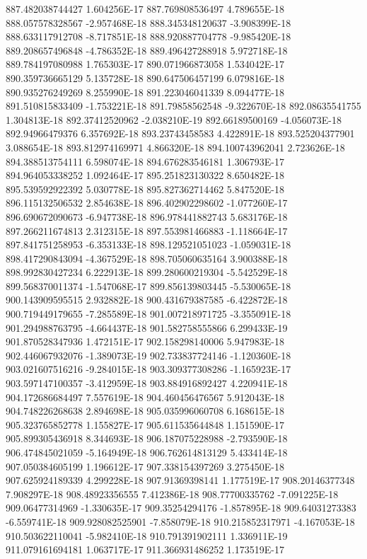 887.482038744427  1.604256E-17
887.769808536497  4.789655E-18
888.057578328567  -2.957468E-18
888.345348120637  -3.908399E-18
888.633117912708  -8.717851E-18
888.920887704778  -9.985420E-18
889.208657496848  -4.786352E-18
889.496427288918  5.972718E-18
889.784197080988  1.765303E-17
890.071966873058  1.534042E-17
890.359736665129  5.135728E-18
890.647506457199  6.079816E-18
890.935276249269  8.255990E-18
891.223046041339  8.094477E-18
891.510815833409  -1.753221E-18
891.79858562548  -9.322670E-18
892.08635541755  1.304813E-18
892.37412520962  -2.038210E-19
892.66189500169  -4.056073E-18
892.94966479376  6.357692E-18
893.23743458583  4.422891E-18
893.525204377901  3.088654E-18
893.812974169971  4.866320E-18
894.100743962041  2.723626E-18
894.388513754111  6.598074E-18
894.676283546181  1.306793E-17
894.964053338252  1.092464E-17
895.251823130322  8.650482E-18
895.539592922392  5.030778E-18
895.827362714462  5.847520E-18
896.115132506532  2.854638E-18
896.402902298602  -1.077260E-17
896.690672090673  -6.947738E-18
896.978441882743  5.683176E-18
897.266211674813  2.312315E-18
897.553981466883  -1.118664E-17
897.841751258953  -6.353133E-18
898.129521051023  -1.059031E-18
898.417290843094  -4.367529E-18
898.705060635164  3.900388E-18
898.992830427234  6.222913E-18
899.280600219304  -5.542529E-18
899.568370011374  -1.547068E-17
899.856139803445  -5.530065E-18
900.143909595515  2.932882E-18
900.431679387585  -6.422872E-18
900.719449179655  -7.285589E-18
901.007218971725  -3.355091E-18
901.294988763795  -4.664437E-18
901.582758555866  6.299433E-19
901.870528347936  1.472151E-17
902.158298140006  5.947983E-18
902.446067932076  -1.389073E-19
902.733837724146  -1.120360E-18
903.021607516216  -9.284015E-18
903.309377308286  -1.165923E-17
903.597147100357  -3.412959E-18
903.884916892427  4.220941E-18
904.172686684497  7.557619E-18
904.460456476567  5.912043E-18
904.748226268638  2.894698E-18
905.035996060708  6.168615E-18
905.323765852778  1.155827E-17
905.611535644848  1.151590E-17
905.899305436918  8.344693E-18
906.187075228988  -2.793590E-18
906.474845021059  -5.164949E-18
906.762614813129  5.433414E-18
907.050384605199  1.196612E-17
907.338154397269  3.275450E-18
907.625924189339  4.299228E-18
907.91369398141  1.177519E-17
908.20146377348  7.908297E-18
908.48923356555  7.412386E-18
908.77700335762  -7.091225E-18
909.06477314969  -1.330635E-17
909.35254294176  -1.857895E-18
909.64031273383  -6.559741E-18
909.928082525901  -7.858079E-18
910.215852317971  -4.167053E-18
910.503622110041  -5.982410E-18
910.791391902111  1.336911E-19
911.079161694181  1.063717E-17
911.366931486252  1.173519E-17
